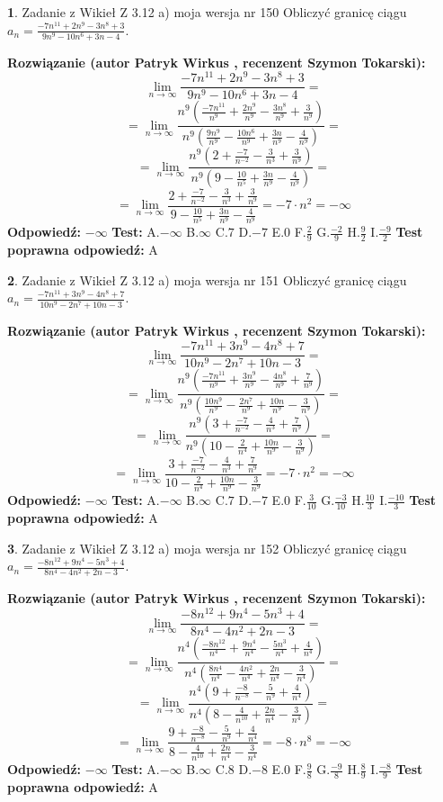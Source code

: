 \documentclass[12pt, a4paper]{article}
\theoremstyle{definition} %
\newtheorem{zad}{}
\newcommand{\zadStart}[1]{\begin{zad}#1\newline}
\newcommand{\zadStop}{\end{zad}}
\newcommand{\rozwStart}[2]{\noindent \textbf{Rozwiązanie (autor #1 , recenzent #2): }\newline}
\newcommand{\rozwStop}{\newline}
\newcommand{\odpStart}{\noindent \textbf{Odpowiedź:}\newline}
\newcommand{\odpStop}{\newline}
\newcommand{\testStart}{\noindent \textbf{Test:}\newline}
\newcommand{\testStop}{\newline}
\newcommand{\kluczStart}{\noindent \textbf{Test poprawna odpowiedź:}\newline}
\newcommand{\kluczStop}{\newline}
\begin{document}
\zadStart{Zadanie z Wikieł Z 3.12 a) moja wersja nr 150}
Obliczyć granicę ciągu $a_{n}=\frac{-7n^{11}+2n^{9}-3n^{8}+3}{9n^{9}-10n^{6}+3n-4}$.
\zadStop
\rozwStart{Patryk Wirkus}{Szymon Tokarski}
$$\lim\limits_{n\to\infty}\frac{-7n^{11}+2n^{9}-3n^{8}+3}{9n^{9}-10n^{6}+3n-4}=$$
$$=\lim\limits_{n\to\infty}\frac{n^{9}\left(\frac{-7n^{11}}{n^{9}}+\frac{2n^{9}}{n^{9}}-\frac{3n^{8}}{n^{9}}+\frac{3}{n^{9}}\right)}{n^{9}\left(\frac{9n^{9}}{n^{9}}-\frac{10n^{6}}{n^{9}}+\frac{3n}{n^{9}}-\frac{4}{n^{9}}\right)}=$$
$$=\lim\limits_{n\to\infty}\frac{n^{9}\left(2+\frac{-7}{n^{-2}}-\frac{3}{n^{3}}+\frac{3}{n^{9}}\right)}
{n^{9}\left(9-\frac{10}{n^{5}}+\frac{3n}{n^{9}}-\frac{4}{n^{9}}\right)}=$$
$$=\lim\limits_{n\to\infty}\frac{2+\frac{-7}{n^{-2}}-\frac{3}{n^{3}}+\frac{3}{n^{9}}}{9-\frac{10}{n^{5}}+\frac{3n}{n^{9}}-\frac{4}{n^{9}}}=-7\cdot n^{2} = -\infty$$
\rozwStop
\odpStart
$-\infty$
\odpStop
\testStart
A.$-\infty$
B.$\infty$
C.$7$
D.$-7$
E.$0$
F.$\frac{2}{9}$
G.$\frac{-2}{9}$
H.$\frac{9}{2}$
I.$\frac{-9}{2}$
\testStop
\kluczStart
A
\kluczStop



\zadStart{Zadanie z Wikieł Z 3.12 a) moja wersja nr 151}
Obliczyć granicę ciągu $a_{n}=\frac{-7n^{11}+3n^{9}-4n^{8}+7}{10n^{9}-2n^{7}+10n-3}$.
\zadStop
\rozwStart{Patryk Wirkus}{Szymon Tokarski}
$$\lim\limits_{n\to\infty}\frac{-7n^{11}+3n^{9}-4n^{8}+7}{10n^{9}-2n^{7}+10n-3}=$$
$$=\lim\limits_{n\to\infty}\frac{n^{9}\left(\frac{-7n^{11}}{n^{9}}+\frac{3n^{9}}{n^{9}}-\frac{4n^{8}}{n^{9}}+\frac{7}{n^{9}}\right)}{n^{9}\left(\frac{10n^{9}}{n^{9}}-\frac{2n^{7}}{n^{9}}+\frac{10n}{n^{9}}-\frac{3}{n^{9}}\right)}=$$
$$=\lim\limits_{n\to\infty}\frac{n^{9}\left(3+\frac{-7}{n^{-2}}-\frac{4}{n^{3}}+\frac{7}{n^{9}}\right)}
{n^{9}\left(10-\frac{2}{n^{4}}+\frac{10n}{n^{9}}-\frac{3}{n^{9}}\right)}=$$
$$=\lim\limits_{n\to\infty}\frac{3+\frac{-7}{n^{-2}}-\frac{4}{n^{3}}+\frac{7}{n^{9}}}{10-\frac{2}{n^{4}}+\frac{10n}{n^{9}}-\frac{3}{n^{9}}}=-7\cdot n^{2} = -\infty$$
\rozwStop
\odpStart
$-\infty$
\odpStop
\testStart
A.$-\infty$
B.$\infty$
C.$7$
D.$-7$
E.$0$
F.$\frac{3}{10}$
G.$\frac{-3}{10}$
H.$\frac{10}{3}$
I.$\frac{-10}{3}$
\testStop
\kluczStart
A
\kluczStop



\zadStart{Zadanie z Wikieł Z 3.12 a) moja wersja nr 152}
Obliczyć granicę ciągu $a_{n}=\frac{-8n^{12}+9n^{4}-5n^{3}+4}{8n^{4}-4n^{2}+2n-3}$.
\zadStop
\rozwStart{Patryk Wirkus}{Szymon Tokarski}
$$\lim\limits_{n\to\infty}\frac{-8n^{12}+9n^{4}-5n^{3}+4}{8n^{4}-4n^{2}+2n-3}=$$
$$=\lim\limits_{n\to\infty}\frac{n^{4}\left(\frac{-8n^{12}}{n^{4}}+\frac{9n^{4}}{n^{4}}-\frac{5n^{3}}{n^{4}}+\frac{4}{n^{4}}\right)}{n^{4}\left(\frac{8n^{4}}{n^{4}}-\frac{4n^{2}}{n^{4}}+\frac{2n}{n^{4}}-\frac{3}{n^{4}}\right)}=$$
$$=\lim\limits_{n\to\infty}\frac{n^{4}\left(9+\frac{-8}{n^{-8}}-\frac{5}{n^{9}}+\frac{4}{n^{4}}\right)}
{n^{4}\left(8-\frac{4}{n^{10}}+\frac{2n}{n^{4}}-\frac{3}{n^{4}}\right)}=$$
$$=\lim\limits_{n\to\infty}\frac{9+\frac{-8}{n^{-8}}-\frac{5}{n^{9}}+\frac{4}{n^{4}}}{8-\frac{4}{n^{10}}+\frac{2n}{n^{4}}-\frac{3}{n^{4}}}=-8\cdot n^{8} = -\infty$$
\rozwStop
\odpStart
$-\infty$
\odpStop
\testStart
A.$-\infty$
B.$\infty$
C.$8$
D.$-8$
E.$0$
F.$\frac{9}{8}$
G.$\frac{-9}{8}$
H.$\frac{8}{9}$
I.$\frac{-8}{9}$
\testStop
\kluczStart
A
\kluczStop
\end{document}
